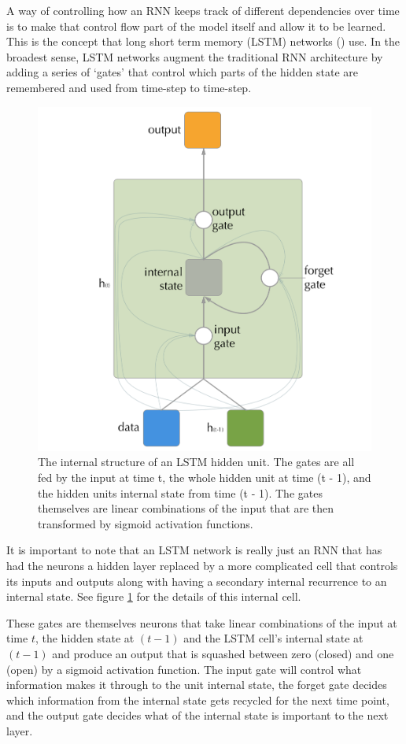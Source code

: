 \documentclass[]{book}
\theoremstyle{definition}
\theoremstyle{definition}
\theoremstyle{definition}
\theoremstyle{remark}
\begin{document}
A way of controlling how an RNN keeps track of different dependencies
over time is to make that control flow part of the model itself and
allow it to be learned. This is the concept that long short term memory
(LSTM) networks (\citet{lstm_intro}) use. In the broadest sense, LSTM
networks augment the traditional RNN architecture by adding a series of
`gates' that control which parts of the hidden state are remembered and
used from time-step to time-step.

\begin{figure}

{\centering \includegraphics[width=0.6\linewidth]{figures/lstm_cell} 

}

\caption{The internal structure of an LSTM hidden unit. The gates are all fed by the input at time t, the whole hidden unit at time (t - 1), and the hidden units internal state from time (t - 1). The gates themselves are linear combinations of the input that are then transformed by sigmoid activation functions.}\label{fig:lstmdiagram}
\end{figure}

It is important to note that an LSTM network is really just an RNN that
has had the neurons a hidden layer replaced by a more complicated cell
that controls its inputs and outputs along with having a secondary
internal recurrence to an internal state. See figure
\ref{fig:lstmdiagram} for the details of this internal cell.

These gates are themselves neurons that take linear combinations of the
input at time \(t\), the hidden state at \((t - 1)\) and the LSTM cell's
internal state at \((t - 1)\) and produce an output that is squashed
between zero (closed) and one (open) by a sigmoid activation function.
The input gate will control what information makes it through to the
unit internal state, the forget gate decides which information from the
internal state gets recycled for the next time point, and the output
gate decides what of the internal state is important to the next layer.
\end{document}
